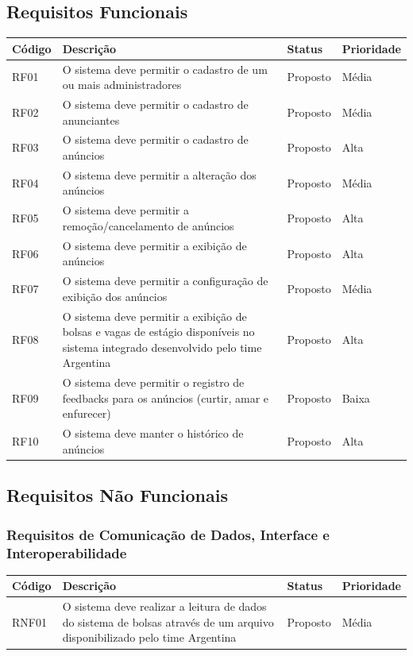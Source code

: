 \documentclass[a4paper, 12pt]{article}
\begin{document}
\subsection{Requisitos Funcionais}
\begin{table}[ht]
	\centering

	\begin{tabular}{p{2cm}p{7cm}p{2cm}p{2cm}}
		\hline
		\cellcolor{gray}Código&\cellcolor{gray}Descrição&\cellcolor{gray}Status&\cellcolor{gray}Prioridade  \\
		\hline
		RF01&O sistema deve permitir o cadastro de um ou mais administradores&Proposto&M\'{e}dia\\
        RF02&O sistema deve permitir o cadastro de anunciantes&Proposto&M\'{e}dia\\
        RF03&O sistema deve permitir o cadastro de an\'{u}ncios&Proposto&Alta\\
        RF04&O sistema deve permitir a altera\c{c}\~{a}o dos an\'{u}ncios&Proposto&M\'{e}dia\\
        RF05&O sistema deve permitir a remo\c{c}\~{a}o/cancelamento de an\'{u}ncios&Proposto&Alta\\
        RF06&O sistema deve permitir a exibi\c{c}\~{a}o de an\'{u}ncios&Proposto&Alta\\
        RF07&O sistema deve permitir a configura\c{c}\~{a}o de exibi\c{c}\~{a}o dos an\'{u}ncios&Proposto&M\'{e}dia\\
        RF08&O sistema deve permitir a exibi\c{c}\~{a}o de bolsas e vagas de est\'{a}gio dispon\'{i}veis no sistema integrado desenvolvido pelo time Argentina&Proposto&Alta\\
        RF09&O sistema deve permitir o registro de feedbacks para os an\'{u}ncios (curtir, amar e enfurecer)&Proposto&Baixa\\
        RF10&O sistema deve manter o hist\'{o}rico de an\'{u}ncios&Proposto&Alta\\
		\hline
	\end{tabular}
\end{table}
\subsection{Requisitos Não Funcionais}
\subsubsection{Requisitos de Comunicação de Dados, Interface e Interoperabilidade}
	\begin{table}[ht]
		\rowcolors{1}{}{}
		\centering

		\begin{tabular}{p{2cm}p{7cm}p{2cm}p{2cm}}
			\hline
			\cellcolor{gray}Código&\cellcolor{gray}Descrição&\cellcolor{gray}Status&\cellcolor{gray}Prioridade  \\
			\hline
            RNF01&O sistema deve realizar a leitura de dados do sistema de bolsas atrav\'{e}s de um arquivo disponibilizado pelo time Argentina&Proposto&M\'{e}dia\\
			\hline
		\end{tabular}
	\end{table}%
\end{document}

